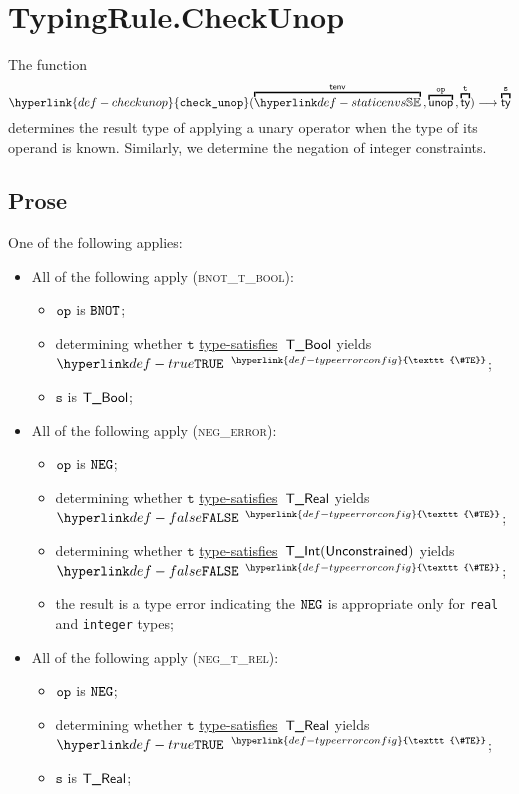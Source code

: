 \documentclass{book}
\newcommand\TypeErrorConfig[0]{\hyperlink{def-typeerrorconfig}{\texttt{\#TE}}}
\newcommand\ProseOrTypeError[0]{\hyperlink{def-proseortypeerror}{$^{\TypeErrorConfig}$}}
\newcommand\typesatisfies[0]{\hyperlink{def-typesatisfies}{type-satisfies}}
\newcommand\CheckUnop[0]{\hyperlink{def-checkunop}{\texttt{check\_unop}}}
\newcommand\vt[0]{\texttt{t}}
\newcommand\vs[0]{\texttt{s}}
\begin{document}
\section{TypingRule.CheckUnop \label{sec:TypingRule.CheckUnop}}
\hypertarget{def-checkunop}{}
The function
\[
  \CheckUnop(\overname{\staticenvs}{\tenv} \aslsep \overname{\unop}{\op} \aslsep \overname{\ty}{\vt})
  \aslto \overname{\ty}{\vs}
\]
determines the result type of applying a unary operator when the type of its operand is known.
Similarly, we determine the negation of integer constraints.

\subsection{Prose}
One of the following applies:
\begin{itemize}
\item All of the following apply (\textsc{bnot\_t\_bool}):
  \begin{itemize}
    \item $\texttt{op}$ is $\texttt{BNOT}$;
    \item determining whether $\vt$ \typesatisfies\ $\textsf{T\_Bool}$ yields $\True$ \ProseOrTypeError;
    \item $\vs$ is $\textsf{T\_Bool}$;
  \end{itemize}

\item All of the following apply (\textsc{neg\_error}):
\begin{itemize}
  \item $\texttt{op}$ is $\texttt{NEG}$;
  \item determining whether $\vt$ \typesatisfies\ $\textsf{T\_Real}$ yields $\False$ \ProseOrTypeError;
  \item determining whether $\vt$ \typesatisfies\ $\textsf{T\_Int}(\textsf{Unconstrained})$ yields $\False$ \ProseOrTypeError;
  \item the result is a type error indicating the $\texttt{NEG}$ is appropriate only for \texttt{real} and \texttt{integer} types;
\end{itemize}

\item All of the following apply (\textsc{neg\_t\_rel}):
\begin{itemize}
  \item $\texttt{op}$ is $\texttt{NEG}$;
  \item determining whether $\vt$ \typesatisfies\ $\textsf{T\_Real}$ yields $\True$ \ProseOrTypeError;
  \item $\vs$ is $\textsf{T\_Real}$;
\end{itemize}


\end{itemize}
\end{document}
